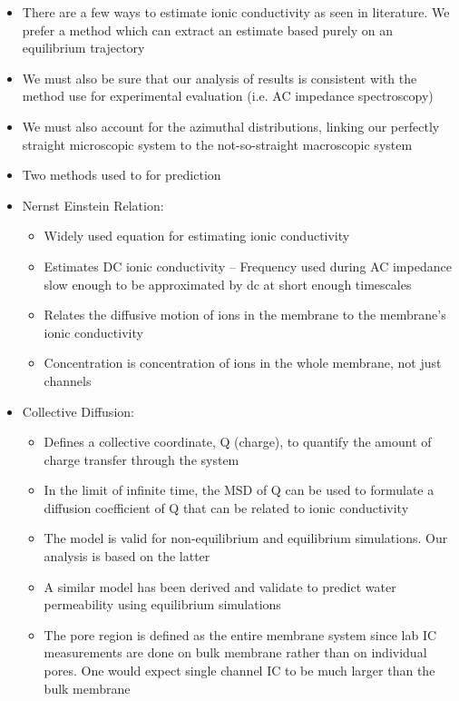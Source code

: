 \documentclass{article}
\begin{document}
	\begin{itemize}
		\item There are a few ways to estimate ionic conductivity as seen in literature. We prefer a method which can extract an estimate based purely on an equilibrium trajectory
		\item We must also be sure that our analysis of results is consistent with the method use for experimental evaluation (i.e. AC impedance spectroscopy)
		\item We must also account for the azimuthal distributions, linking our perfectly straight microscopic system to the not-so-straight macroscopic system
		\item Two methods used to for prediction
		\item Nernst Einstein Relation:
		\begin{itemize}
			\item Widely used equation for estimating ionic conductivity
			\item Estimates DC ionic conductivity -- Frequency used during AC impedance slow enough to be approximated by dc at short enough timescales
			\item Relates the diffusive motion of ions in the membrane to the membrane's ionic conductivity
			\item Concentration is concentration of ions in the whole membrane, not just channels
		\end{itemize}
		\item Collective Diffusion:
		\begin{itemize}
			\item Defines a collective coordinate, Q (charge), to quantify the amount of charge transfer through the system
			\item In the limit of infinite time, the MSD of Q can be used to formulate a diffusion coefficient of Q that can be related to ionic conductivity
			\item The model is valid for non-equilibrium and equilibrium simulations. Our analysis is based on the latter
			\item A similar model has been derived and validate to predict water permeability using equilibrium simulations
			\item The pore region is defined as the entire membrane system since lab IC measurements are done on bulk membrane rather than on individual pores. One would expect single channel IC to be much larger than the bulk membrane

\end{itemize}
\end{itemize}
\end{document}
